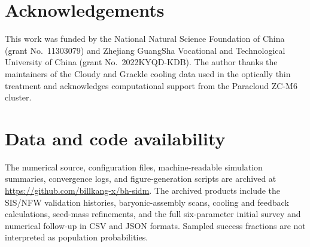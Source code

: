 \documentclass[11pt]{article}
\begin{document}
\section*{Acknowledgements}
This work was funded by the National Natural Science Foundation of China (grant No.~11303079) and Zhejiang GuangSha Vocational and Technological University of China (grant No.~2022KYQD-KDB).  The author thanks the maintainers of the Cloudy and Grackle cooling data used in the optically thin treatment and acknowledges computational support from the Paracloud ZC-M6 cluster.

\section*{Data and code availability}
The numerical source, configuration files, machine-readable simulation summaries, convergence logs, and figure-generation scripts are archived at \url{https://github.com/billkang-x/bh-sidm}.  The archived products include the SIS/NFW validation histories, baryonic-assembly scans, cooling and feedback calculations, seed-mass refinements, and the full six-parameter initial survey and numerical follow-up in CSV and JSON formats.  Sampled success fractions are not interpreted as population probabilities.



\end{document}
